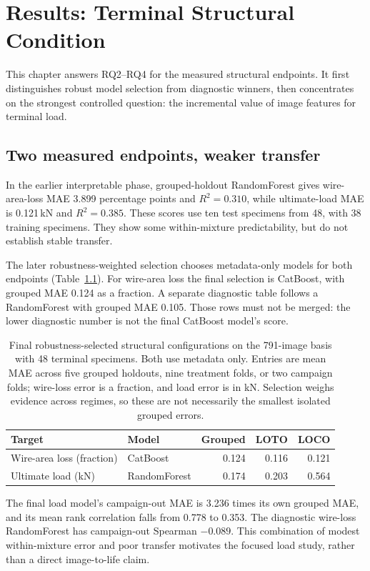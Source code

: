 \chapter{Results: Terminal Structural Condition}\label{ch:structural}
This chapter answers RQ2--RQ4 for the measured structural endpoints. It first distinguishes robust model selection from diagnostic winners, then concentrates on the strongest controlled question: the incremental value of image features for terminal load.

\section{Two measured endpoints, weaker transfer}
In the earlier interpretable phase, grouped-holdout RandomForest gives wire-area-loss MAE 3.899 percentage points and $R^2=0.310$, while ultimate-load MAE is 0.121\,kN and $R^2=0.385$. These scores use ten test specimens from 48, with 38 training specimens. They show some within-mixture predictability, but do not establish stable transfer.

The later robustness-weighted selection chooses metadata-only models for both endpoints (Table~\ref{tab:robustselection}). For wire-area loss the final selection is CatBoost, with grouped MAE 0.124 as a fraction. A separate diagnostic table follows a RandomForest with grouped MAE 0.105. Those rows must not be merged: the lower diagnostic number is not the final CatBoost model's score.
\begin{table}[htbp]\centering\small
\caption[Final robustness-selected structural models]{Final robustness-selected structural configurations on the 791-image basis with 48 terminal specimens. Both use metadata only. Entries are mean MAE across five grouped holdouts, nine treatment folds, or two campaign folds; wire-loss error is a fraction, and load error is in kN. Selection weighs evidence across regimes, so these are not necessarily the smallest isolated grouped errors.}\label{tab:robustselection}
\begin{tabular}{llrrr}\toprule
Target & Model & Grouped & LOTO & LOCO\\\midrule
Wire-area loss (fraction) & CatBoost & 0.124 & 0.116 & 0.121\\
Ultimate load (kN) & RandomForest & 0.174 & 0.203 & 0.564\\\bottomrule
\end{tabular}
\end{table}
The final load model's campaign-out MAE is 3.236 times its own grouped MAE, and its mean rank correlation falls from 0.778 to 0.353. The diagnostic wire-loss RandomForest has campaign-out Spearman $-0.089$. This combination of modest within-mixture error and poor transfer motivates the focused load study, rather than a direct image-to-life claim.

